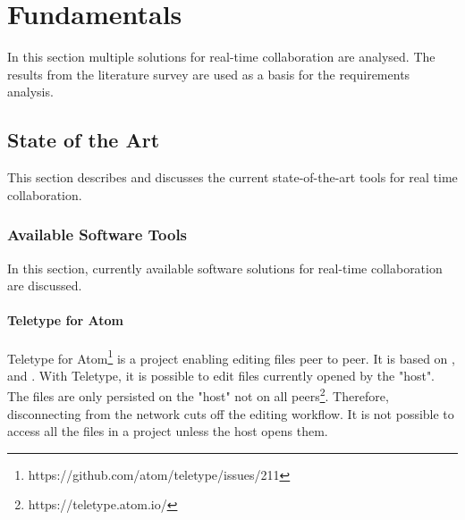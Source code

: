 \chapter{Fundamentals}
\label{sec:fundamentals}

In this section multiple solutions for real-time collaboration are analysed. 
The results from the literature survey are used as a basis for the requirements analysis.

\section{State of the Art}
\label{sec:stateoftheart}

This section describes and discusses the current state-of-the-art tools for real time collaboration.

\subsection{Available Software Tools}

In this section, currently available software solutions for real-time collaboration are discussed.

\subsubsection{Teletype for Atom}
Teletype for Atom\footnote{https://github.com/atom/teletype/issues/211} is a project enabling editing files peer to peer. It is based on \cite{Oster:2006:DataconsistencyforP2Pcollaborativeediting}, \cite{YuWeihai:2014} and \cite{BriotUrsoShapiro:2016:HighResponsivenessGroupEditing}.
With Teletype, it is possible to edit files currently opened by the "host". The files are only persisted on the "host" not on all peers\footnote{https://teletype.atom.io/}.
Therefore, disconnecting from the network cuts off the editing workflow. It is not possible to access all the files in a project unless the host opens them. 
